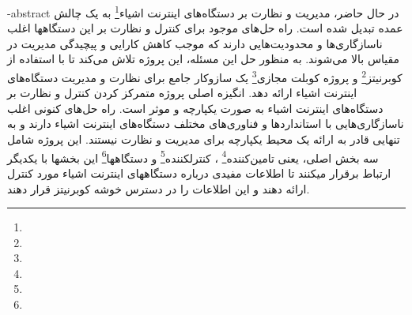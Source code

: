 \fa-abstract{
    در حال حاضر، مدیریت و نظارت بر دستگاه‌های
    اینترنت اشیاء\footnote{}
    به یک چالش عمده تبدیل شده است. راه حل‌های موجود
    برای کنترل و نظارت بر این دستگاهها اغلب ناسازگاری‌ها و محدودیت‌هایی دارند که موجب کاهش کارایی و پیچیدگی مدیریت در مقیاس بالا می‌شوند.
    به منظور حل این مسئله، این پروژه تلاش می‌کند تا با استفاده از 
    کوبرنیتز\footnote{}
    و پروژه
    کوبلت مجازی\footnote{}
    یک سازوکار جامع برای نظارت و مدیریت دستگاه‌های اینترنت اشیاء ارائه دهد. انگیزه اصلی پروژه متمرکز
    کردن کنترل و نظارت بر دستگاه‌های اینترنت اشیاء به صورت یکپارچه و موثر است. راه حل‌های کنونی اغلب ناسازگاری‌هایی
    با استانداردها و فناوری‌های مختلف دستگاه‌های اینترنت اشیاء دارند و به تنهایی قادر به ارائه یک محیط یکپارچه برای
    مدیریت و نظارت نیستند. این پروژه شامل سه بخش اصلی، یعنی
    تامین‌کننده\footnote{}
    ، کنترلکننده\footnote{}
    و دستگاهها\footnote{}
    این بخشها با یکدیگر ارتباط برقرار میکنند تا اطلاعات مفیدی درباره دستگاههای اینترنت اشیاء مورد کنترل ارائه دهند
    و این اطلاعات را در دسترس خوشه کوبرنیتز قرار دهند.
}

%

\abstractPage

\newpage\clearpage